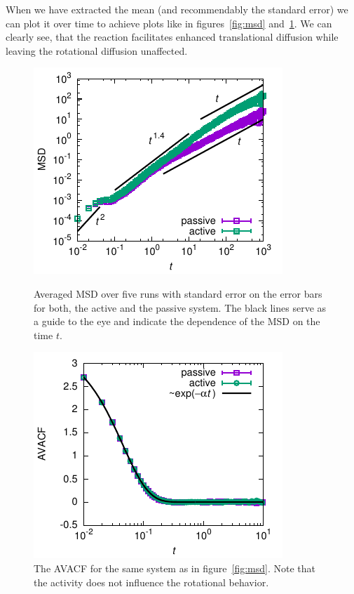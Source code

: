 \documentclass[aip,jcp,reprint,a4paper,onecolumn,nofootinbib,amsmath,amssymb]{revtex4-1}
\begin{document}
When we have extracted the mean (and recommendably the standard error)
we can plot it over time to achieve plots like in
figures~\ref{fig:msd} and~\ref{fig:avacf}.  We can clearly see, that
the reaction facilitates enhanced translational diffusion while
leaving the rotational diffusion unaffected.

\begin{figure}[tb]
  \centering
  \leavevmode\hfill
  \begin{minipage}[t]{.45\linewidth}
    \centering
    \includegraphics{FIGURES/msd}
    \caption{Averaged MSD over five runs with standard error on the
      error bars for both, the active and the passive system.  The
      black lines serve as a guide to the eye and indicate the
      dependence of the MSD on the time $t$.}
    \label{fig:msd}
  \end{minipage}
  \hfill
  \begin{minipage}[t]{.45\linewidth}
    \centering
    \includegraphics{FIGURES/avacf}
    \caption{The AVACF for the same system as in
      figure~\ref{fig:msd}. Note that the activity does not influence
      the rotational behavior.}
    \label{fig:avacf}
  \end{minipage}
  \hfill\null
\end{figure}
\end{document}
